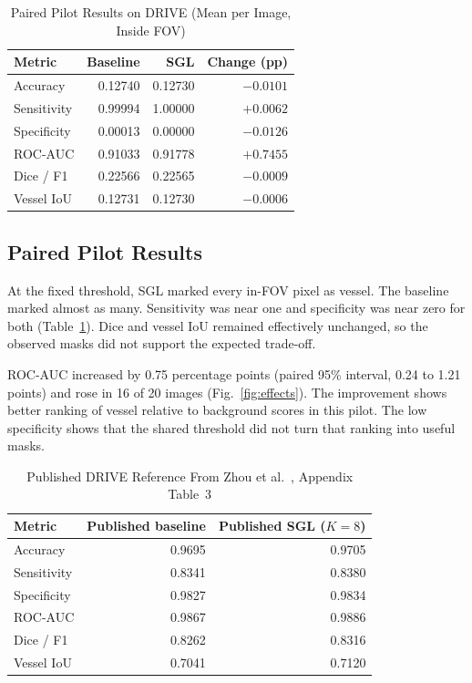 \documentclass[a4paper,conference]{IEEEtran}
\begin{document}
\begin{table}[!t]
\caption{Paired Pilot Results on DRIVE (Mean per Image, Inside FOV)}
\label{tab:pilot}
\centering\footnotesize
\begin{tabular}{@{}lrrr@{}}
\toprule
Metric & Baseline & SGL & Change (pp) \\
\midrule
Accuracy & 0.12740 & 0.12730 & \(-0.0101\) \\
Sensitivity & 0.99994 & 1.00000 & \(+0.0062\) \\
Specificity & 0.00013 & 0.00000 & \(-0.0126\) \\
ROC-AUC & 0.91033 & 0.91778 & \(+0.7455\) \\
Dice / F1 & 0.22566 & 0.22565 & \(-0.0009\) \\
Vessel IoU & 0.12731 & 0.12730 & \(-0.0006\) \\
\bottomrule
\end{tabular}
\end{table}

\subsection{Paired Pilot Results}
At the fixed threshold, SGL marked every in-FOV pixel as vessel. The baseline marked almost as many. Sensitivity was near one and specificity was near zero for both (Table~\ref{tab:pilot}). Dice and vessel IoU remained effectively unchanged, so the observed masks did not support the expected trade-off.

ROC-AUC increased by 0.75 percentage points (paired 95\% interval, 0.24 to 1.21 points) and rose in 16 of 20 images (Fig.~\ref{fig:effects}). The improvement shows better ranking of vessel relative to background scores in this pilot. The low specificity shows that the shared threshold did not turn that ranking into useful masks.

\begin{table}[!t]
\caption{Published DRIVE Reference From Zhou et al.~\cite{zhou}, Appendix Table~3}
\label{tab:reference}
\centering\footnotesize
\begin{tabular}{@{}lrr@{}}
\toprule
Metric & Published baseline & Published SGL (\(K=8\)) \\
\midrule
Accuracy & 0.9695 & 0.9705 \\
Sensitivity & 0.8341 & 0.8380 \\
Specificity & 0.9827 & 0.9834 \\
ROC-AUC & 0.9867 & 0.9886 \\
Dice / F1 & 0.8262 & 0.8316 \\
Vessel IoU & 0.7041 & 0.7120 \\
\bottomrule
\end{tabular}
\end{table}
\end{document}
